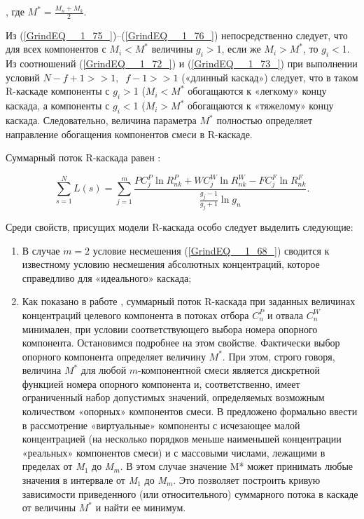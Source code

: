 , где $M^{*} =\frac{M_{n} +M_{k} }{2} $.

Из (\ref{GrindEQ__1_75_})--(\ref{GrindEQ__1_76_}) непосредственно следует, что для всех компонентов с $M_{i} $$\mathrm{<}$$M^{*} $ величины $g_{i} $$\mathrm{>}$1, если же $M_{i} $$\mathrm{>}$$M^{*} $, то $g_{i} $$\mathrm{<}$1. Из соотношений (\ref{GrindEQ__1_72_}) и (\ref{GrindEQ__1_73_}) при выполнении условий $N-f+1>>1,\; \; f-1>>1$ («длинный каскад») следует, что в таком R-каскаде компоненты с $g_{i} $$\mathrm{>}$1 ($M_{i} $$\mathrm{<}$$M^{*} $ обогащаются к «легкому» концу каскада, а компоненты с $g_{i} $$\mathrm{<}$1 ($M_{i} $$\mathrm{>}$$M^{*}$ обогащаются к «тяжелому» концу каскада. Следовательно, величина параметра $M^{*}$ полностью определяет направление обогащения компонентов смеси в R-каскаде. 

Суммарный поток R-каскада равен \cite{sulaberidzeTeoriyaKaskadovDlya2011}:

\begin{equation} \label{GrindEQ__1_77_} 
  \sum _{s=1}^{N}L(s) =\sum _{j=1}^{m}\frac{PC_{j}^{P} \ln R_{nk}^{P} +WC_{j}^{W} \ln R_{nk}^{W} -FC_{j}^{F} \ln R_{nk}^{F} }{\frac{g_{j} -1}{g_{j} +1} \ln g_{n} }  .               
\end{equation} 

Среди свойств, присущих модели R-каскада особо следует выделить следующие:

\begin{enumerate}
  \item В случае $m=2$ условие несмешения (\ref{GrindEQ__1_68_}) сводится к известному условию несмешения абсолютных концентраций, которое справедливо для «идеального» каскада;
  \item	Как показано в работе \cite{songComparativeStudyModel2010}, суммарный поток R-каскада при заданных величинах концентраций целевого компонента в потоках отбора $C_{n}^{P}$ и отвала $C_{n}^{W}$ минимален, при условии соответствующего выбора номера опорного компонента. Остановимся подробнее на этом свойстве. Фактически выбор опорного компонента определяет величину $M^{*}$. При этом, строго говоря, величина $M^{*}$ для любой $m$-компонентной смеси является дискретной функцией номера опорного компонента и, соответственно, имеет ограниченный набор допустимых значений, определяемых возможным количеством «опорных» компонентов смеси. В \cite{sulaberidzeSravnenieOptimalnyhModelnyh2008} предложено формально ввести в рассмотрение «виртуальные» компоненты с исчезающее малой концентрацией (на несколько порядков меньше наименьшей концентрации «реальных» компонентов смеси) и с массовыми числами, лежащими в пределах от \textit{M${}_{1}$} до \textit{M${}_{m}$}. В этом случае значение M* может принимать любые значения в интервале от \textit{M${}_{1}$} до \textit{M${}_{m}$}. Это позволяет построить кривую зависимости приведенного (или относительного) суммарного потока в каскаде от величины $M^{*}$ и найти ее минимум. 
\end{enumerate}
  
